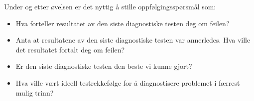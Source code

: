 Under og etter øvelsen er det nyttig å stille oppfølgingsspørsmål som:

\begin{itemize}
\item{} Hva forteller resultatet av den siste diagnostiske testen deg om feilen?
\item{} Anta at resultatene av den siste diagnostiske testen var annerledes. Hva ville det resultatet fortalt deg om feilen?
\item{} Er den siste diagnostiske testen den beste vi kunne gjort?
\item{} Hva ville vært ideell testrekkefølge for å diagnostisere problemet i færrest mulig trinn?
\end{itemize}



